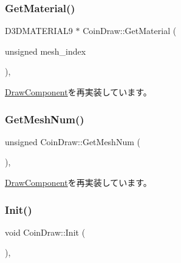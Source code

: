 \subsubsection{\texorpdfstring{Get\+Material()}{GetMaterial()}}
{\footnotesize\ttfamily D3\+D\+M\+A\+T\+E\+R\+I\+A\+L9 $\ast$ Coin\+Draw\+::\+Get\+Material (\begin{DoxyParamCaption}\item[{unsigned}]{mesh\+\_\+index }\end{DoxyParamCaption})\hspace{0.3cm}{\ttfamily [override]}, {\ttfamily [virtual]}}



\mbox{\hyperlink{class_draw_component_adae078d5139f691997763bf6cac9e25a}{Draw\+Component}}を再実装しています。

\mbox{\label{class_coin_draw_a9f5aa847fcb28e5617f00d575a6a911c}} 
\subsubsection{\texorpdfstring{Get\+Mesh\+Num()}{GetMeshNum()}}
{\footnotesize\ttfamily unsigned Coin\+Draw\+::\+Get\+Mesh\+Num (\begin{DoxyParamCaption}{ }\end{DoxyParamCaption})\hspace{0.3cm}{\ttfamily [override]}, {\ttfamily [virtual]}}



\mbox{\hyperlink{class_draw_component_a5f3bbcc8e563b740c0a5535170921c75}{Draw\+Component}}を再実装しています。

\mbox{\label{class_coin_draw_ad0f5da5cfb896541fd59b1ab4a8593d1}} 
\subsubsection{\texorpdfstring{Init()}{Init()}}
{\footnotesize\ttfamily void Coin\+Draw\+::\+Init (\begin{DoxyParamCaption}{ }\end{DoxyParamCaption})\hspace{0.3cm}{\ttfamily [override]}, {\ttfamily [virtual]}}



